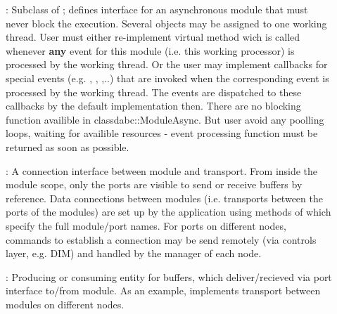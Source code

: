 \begin{description}
\item[] : 
Subclass of ; defines interface for an 
   asynchronous module that must never block the execution. Several 
    objects may be assigned to one working thread. User must 
   either re-implement virtual method  wich is called 
   whenever {\bf any} event for this module (i.e. this working processor) 
   is processed by the working thread. Or the user may implement 
   callbacks for special events (e.g. , 
   , ,..) that are invoked when 
   the corresponding event is processed by the working thread. 
   The events are dispatched to these callbacks by the  
   default implementation then. There are no blocking function availible in class{dabc::ModuleAsync}.  
   But user  avoid any poolling loops, waiting for availible resources - 
   event processing function must be returned as soon as possible.

\item[] : 
A connection interface between module and transport. 
   From inside the module scope, only the ports are visible to send or  receive 
   buffers by reference. Data connections between modules 
   (i.e. transports between the ports of the modules) are set up by 
   the application using methods of  which specify the full 
   module/port names. For ports on different nodes, commands to establish 
   a connection may be send remotely (via controls layer, e.g. DIM) and 
   handled by the manager of each node.  

\item[] : 
Producing or consuming entity for buffers, which deliver/recieved via port interface to/from module.   
As an example,  implements transport between modules on different nodes.


\end{description}
